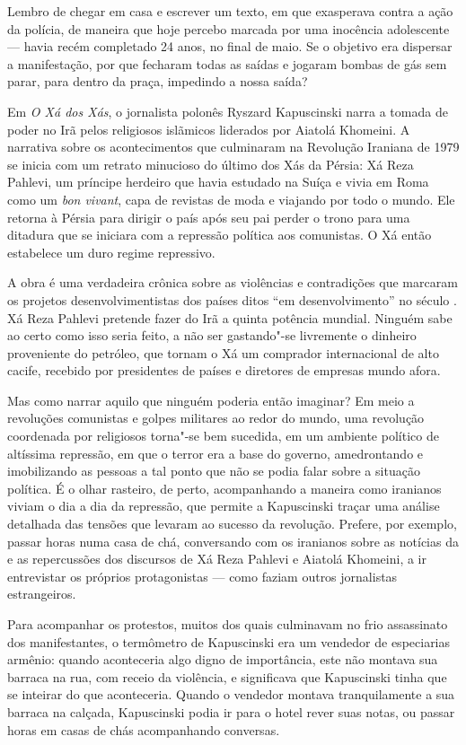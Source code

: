 Lembro de chegar em casa e escrever um texto, em que exasperava contra
a ação da polícia, de maneira que hoje percebo marcada por uma inocência
adolescente --- havia recém completado 24 anos, no final de maio. Se o
objetivo era dispersar a manifestação, por que fecharam todas as saídas
e jogaram bombas de gás sem parar, para dentro da praça, impedindo a
nossa saída?

\asterisc

Em \emph{O Xá dos Xás}, o jornalista polonês Ryszard Kapuscinski narra a
tomada de poder no Irã pelos religiosos islãmicos liderados por Aiatolá
Khomeini. A narrativa sobre os acontecimentos que culminaram na
Revolução Iraniana de 1979 se inicia com um retrato minucioso do último
dos Xás da Pérsia: Xá Reza Pahlevi, um príncipe herdeiro que havia
estudado na Suíça e vivia em Roma como um \emph{bon vivant}, capa de
revistas de moda e viajando por todo o mundo. Ele retorna à Pérsia para
dirigir o país após seu pai perder o trono para uma ditadura que
se iniciara com a repressão política aos comunistas. O Xá então estabelece
um duro regime repressivo.

A obra é uma verdadeira crônica sobre as violências e contradições que
marcaram os projetos desenvolvimentistas dos países ditos ``em desenvolvimento'' no século .
Xá Reza Pahlevi pretende fazer do Irã a quinta potência mundial. Ninguém
sabe ao certo como isso seria feito, a não ser gastando"-se livremente o
dinheiro proveniente do petróleo, que tornam o Xá um comprador internacional
de alto cacife, recebido por presidentes de países e diretores
de empresas mundo afora.

Mas como narrar aquilo que ninguém poderia então imaginar? Em meio a
revoluções comunistas e golpes militares ao redor do mundo, uma
revolução coordenada por religiosos torna"-se bem sucedida, em um
ambiente político de altíssima repressão, em que o terror era a base do
governo, amedrontando e imobilizando as pessoas a tal ponto que
não se podia falar sobre a situação política. É o olhar rasteiro, de
perto, acompanhando a maneira como iranianos viviam o dia a dia da
repressão, que permite a Kapuscinski traçar uma análise detalhada das
tensões que levaram ao sucesso da revolução. Prefere, por exemplo,
passar horas numa casa de chá, conversando com os iranianos sobre as
notícias da  e as repercussões dos discursos de Xá Reza Pahlevi e
Aiatolá Khomeini, a ir entrevistar os próprios protagonistas --- como
faziam outros jornalistas estrangeiros.

Para acompanhar os protestos, muitos dos quais culminavam no frio
assassinato dos manifestantes, o termômetro de Kapuscinski era um
vendedor de especiarias armênio: quando aconteceria algo digno de
importância, este não montava sua barraca na rua, com receio da
violência, e significava que Kapuscinski tinha que se inteirar do que
aconteceria. Quando o vendedor montava tranquilamente a sua barraca na
calçada, Kapuscinski podia ir para o hotel rever suas notas, ou passar
horas em casas de chás acompanhando conversas.

